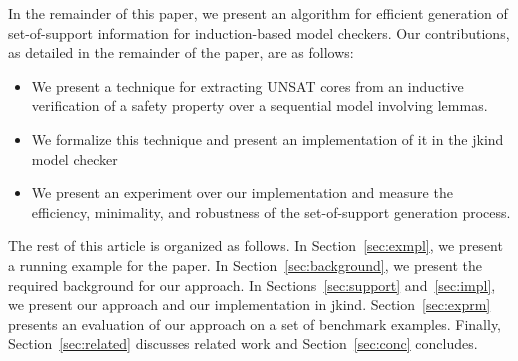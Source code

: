 In the remainder of this paper, we present an algorithm for efficient generation of set-of-support information for induction-based model checkers.  Our contributions, as detailed in the remainder of the paper, are as follows: 

\begin{itemize}
    \item We present a technique for extracting UNSAT cores from an inductive verification of a safety property over a sequential model involving lemmas.
    \item We formalize this technique and present an implementation of it in the jkind model checker~\cite{jkind}
    \item We present an experiment over our implementation and measure the efficiency, minimality, and robustness of the set-of-support generation process.
\end{itemize}

The rest of this article is organized as follows. In Section~\ref{sec:exmpl}, we present a running example for the paper.  In Section~\ref{sec:background}, we present the required background for our approach.  In Sections~\ref{sec:support} and~\ref{sec:impl}, we present our approach and our implementation in jkind.  Section~\ref{sec:exprm} presents an evaluation of our approach on a set of benchmark examples.  Finally, Section~\ref{sec:related} discusses related work and Section~\ref{sec:conc} concludes.

\iffalse
\begin{itemize}
    \item Overview of the problem: sequential model checkers do not provide much insight into proofs.
    \item Section should roughly follow the structure of "Finding Minimal Unsatisfiable Cores of
        Declarative Specifications" paper by Torlak et al (with Dan Jackson).
    \item UNSAT Cores have been used for a variety of analysis tasks
    \item we want to generalize this idea for sequential systems
\end{itemize}
\fi
  
